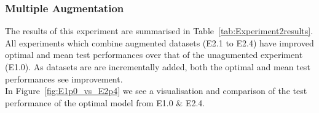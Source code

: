 \subsubsection{Multiple Augmentation} \label{MultiAug}

The results of this experiment are summarised in Table~\ref{tab:Experiment2results}. All experiments which combine augmented datasets (E2.1 to E2.4) have improved optimal and mean test performances over that of the unagumented experiment (E1.0). As datasets are are incrementally added, both the optimal and mean test performances see improvement. 
\\

\noindent
In Figure~\ref{fig:E1p0_vs_E2p4} we see a visualisation and comparison of the test performance of the optimal model from E1.0 \& E2.4. 


